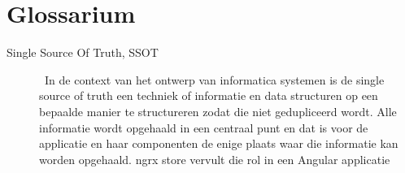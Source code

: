 
\chapter{Glossarium}
\label{ch:glossarium}


\begin{description}
\item[Single Source Of Truth, SSOT] \hfill \ In de context van het ontwerp van informatica systemen is de single source of truth een techniek of informatie en data structuren op een bepaalde manier te structureren zodat die niet gedupliceerd wordt. Alle informatie wordt opgehaald in een centraal punt en dat is voor de applicatie en haar componenten de enige plaats waar die informatie kan worden opgehaald. ngrx store vervult die rol in een Angular applicatie
\end{description}